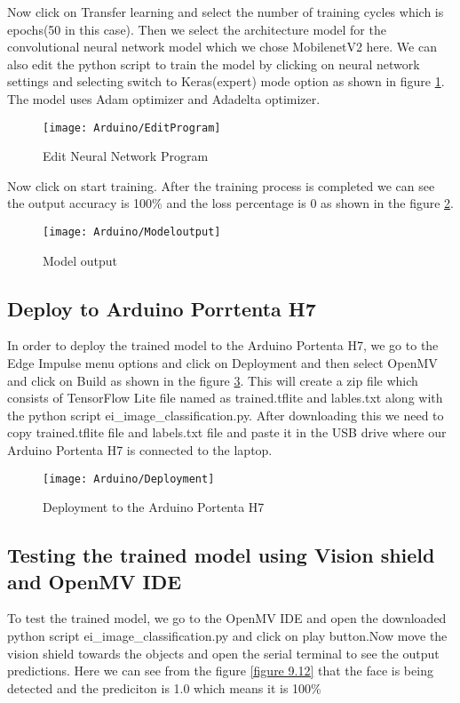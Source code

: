Now click on Transfer learning and select the number of training cycles which is epochs(50 in this case). Then we  select the architecture model for the convolutional neural network model which we chose MobilenetV2 here.
We can also edit the python script to train the model by clicking on neural network settings and selecting switch to Keras(expert) mode option as shown in figure \ref{figure 9.9}. The model uses Adam optimizer and Adadelta optimizer.

\begin{figure}
	\centering
	\texttt{[image: Arduino/EditProgram]}
	\caption{Edit Neural Network Program }
	\label{figure 9.9}
\end{figure}

Now click on start training. After the training process is completed we can see the output accuracy  is 100\% and the loss percentage is 0 as shown in the figure \ref{figure 9.10}.

\begin{figure}
	\centering
	\texttt{[image: Arduino/Modeloutput]}
	\caption{Model output }
	\label{figure 9.10}
\end{figure}

\subsection{Deploy to Arduino Porrtenta H7}
In order to deploy the trained model to the Arduino Portenta H7, we go to the Edge Impulse menu options and click on Deployment and then select OpenMV and click on Build as shown in the figure \ref{figure 9.11}. This will create a zip file which consists of TensorFlow Lite file named as trained.tflite and lables.txt along with the python script ei\_image\_classification.py. After downloading this we need to copy trained.tflite file and labels.txt file and paste it in the USB drive where our Arduino Portenta H7 is connected to the laptop.
\begin{figure}[H]
	\centering
	\texttt{[image: Arduino/Deployment]}
	\caption{Deployment to the Arduino Portenta H7}
	\label{figure 9.11}
\end{figure}
\subsection{Testing the trained model using Vision shield and OpenMV IDE}
To test the trained model, we go to the OpenMV IDE and open the downloaded python script ei\_image\_classification.py and click on play button.Now move the vision shield towards the objects and open the serial terminal to see the output predictions. Here we can see from the figure \ref{figure 9.12} that the face is being detected and the prediciton is 1.0 which means it is 100\%

